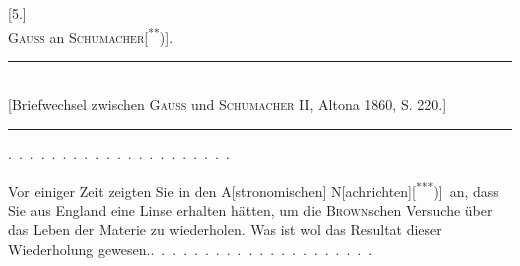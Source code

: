 \clearpage\begingroup{}
\begin{center}
[5.]\\[.7em]
\textsc{Gauss} an \textsc{Schumacher}[\textsuperscript{**})].
\par\smallskip\rule{.78\textwidth}{.35pt}\\
{\small [Briefwechsel zwischen \textsc{Gauss} und \textsc{Schumacher} II, Altona 1860, S. 220.]}\\
\rule{.78\textwidth}{.35pt}
\end{center}
\begingroup\renewcommand{\thefootnote}{}\endgroup
\noindent .\ .\ .\ .\ .\ .\ .\ .\ .\ .\ .\ .\ .\ .\ .\ .\ .\ .\ .\ .\ .
\par\noindent\hspace*{\parindent}Vor einiger Zeit zeigten Sie in den A[stronomischen] N[achrichten][\textsuperscript{***})]\begingroup\renewcommand{\thefootnote}{}\endgroup\ an, dass Sie aus England eine Linse erhalten hätten, um die \textsc{Brown}schen
Versuche über das Leben der Materie zu wiederholen. Was ist wol das Resultat
dieser Wiederholung gewesen.\quad .\ .\ .\ .\ .\ .\ .\ .\ .\ .\ .\ .\ .\ .\ .\ .\ .\ .\ .\ .\ .
\clearpage\endgroup
